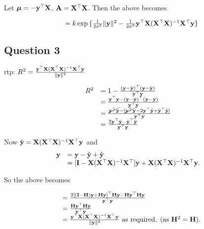 \documentclass{article}[12pt]
\begin{document}
Let ${\boldsymbol \mu} = -{\bf y}^\top {\bf X}$, ${\bf A} = {\bf X}^\top {\bf X}$. Then the above becomes

\begin{equation*}
\begin{array}{ll}
&= k \exp{ \{ \frac{1}{2 \sigma^2} \| {\bf y}\|^2 - \frac{1}{2 \sigma^2} {\bf y}^\top {\bf X}({\bf X}^\top {\bf X})^{-1} {\bf X}^\top {\bf y}\} }
\end{array}
\end{equation*}

\subsection{Question 3}

rtp: $R^2 = \frac{{\bf y}^\top {\bf X} ({\bf X}^\top {\bf X})^{-1} {\bf X}^\top {\bf y}}{\| {\bf y} \|^2}$

\begin{equation*}
\begin{array}{ll}
R^2 &= 1 - \frac{({\bf y} - \hat{{\bf y}})^\top ({\bf y} - \hat{{\bf y}})}{{\bf y}^\top {\bf y}} \\
&= \frac{{\bf y}^\top {\bf y} - ({\bf y} - \hat{{\bf y}})^\top ({\bf y} - \hat{{\bf y}})}{{\bf y}^\top {\bf y}} \\
&= \frac{\cancel{{\bf y}^\top {\bf y}} - [\cancel{{\bf y}^\top {\bf y}} - 2 {\bf y}^\top \hat{{\bf y}} + \hat{{\bf y}}^\top \hat{{\bf y}}]}{{\bf y}^\top {\bf y}} \\
&= \frac{2 {\bf y}^\top \hat{{\bf y}} - \hat{{\bf y}}^\top \hat{{\bf y}}}{{\bf y}^\top {\bf y}}
\end{array}
\end{equation*}

Now $\hat{{\bf y}} = {\bf X} ({\bf X}^\top {\bf X})^{-1} {\bf X}^\top {\bf y}$ and
\begin{equation*}
\begin{array}{ll}
{\bf y} &= {\bf y} - \hat{{\bf y}} + \hat{{\bf y}} \\
&= [{\bf I} - {\bf X} ({\bf X}^\top {\bf X})^{-1} {\bf X}^\top] {\bf y} + {\bf X} ({\bf X}^\top {\bf X})^{-1} {\bf X}^\top {\bf y}.
\end{array}
\end{equation*}

So the above becomes

\begin{equation*}
\begin{array}{ll}
&= \frac{2[({\bf I} - {\bf H}) {\bf y} + {\bf H} {\bf y}]^\top {\bf H} {\bf y} - {\bf H} {\bf y}^\top {\bf H} {\bf y}}{{\bf y}^\top {\bf y}} \\
&= \frac{{\bf H} {\bf y}^\top {\bf H} {\bf y}}{{\bf y}^\top {\bf y}} \\
&= \frac{{\bf y}^\top {\bf X} ({\bf X}^\top {\bf X})^{-1} {\bf X}^\top {\bf y}}{\| {\bf y} \|^2} \text{ as required. } (\text{as } {\bf H}^2 = {\bf H}).
\end{array}
\end{equation*}
\end{document}
